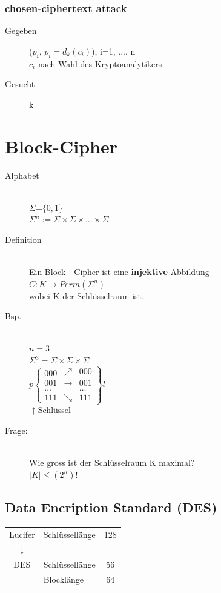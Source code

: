 \documentclass[10pt]{article}
\newcommand{\ra}{\rightarrow}
\newcommand{\Brackal}[2]{\left\lbrace\begin{array}{#1} #2 \end{array}\right.} %
\newcommand{\Brackar}[2]{\left.\begin{array}{#1} #2 \end{array}\right\rbrace} %
\begin{document}
\subsubsection{chosen-ciphertext attack}
\begin{description}
	\item[Gegeben] ($p_i$, $p_i=d_k(c_i)$), i=1, ..., n \\
		$c_i$ nach Wahl des Kryptoanalytikers
	\item[Gesucht] k
\end{description}

\newpage
\section{Block-Cipher}
\begin{description}
	\item[Alphabet] \hfill \\
		$\Sigma$=$\{0,1\}$ \\
		$\Sigma^n := \Sigma \times \Sigma \times \dots \times \Sigma$ 
	\item[Definition] \hfill \\
		Ein Block - Cipher ist eine \textbf{injektive} Abbildung \\
		$C: K \ra Perm(\Sigma^n)$ \\
		wobei K der Schlüsselraum ist.
	\item[Bsp.] \hfill \\
		$n=3$ \\
		$\Sigma^3=\Sigma\times\Sigma\times\Sigma$\\
$p\Brackal{c}{000\\001\\\dots\\111}\Brackar{cc}{\nearrow&000\\\to&001\\&\dots\\\searrow&111}l$\\
\hspace*{1.8cm}$\uparrow$Schlüssel\\
	\item[Frage:] \hfill \\
		Wie gross ist der Schlüsselraum K maximal? \\
		$|K| \leq (2^n)!$
\end{description}
\subsection{Data Encription Standard (DES)}
\begin{tabular}{clc}
 Lucifer&Schlüssellänge& 128\\
 $\downarrow$\\
 DES&Schlüssellänge& 56\\
 &Blocklänge& 64
\end{tabular}\\
\end{document}
